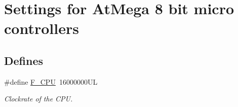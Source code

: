 \hypertarget{group___a_t_m_e_g_a___s_e_t_t_i_n_g_s}{\section{\-Settings for \-At\-Mega 8 bit micro controllers}
\label{group___a_t_m_e_g_a___s_e_t_t_i_n_g_s}
}
\subsection*{\-Defines}
\begin{DoxyCompactItemize}
\item 
\hypertarget{group___a_t_m_e_g_a___s_e_t_t_i_n_g_s_ga43bafb28b29491ec7f871319b5a3b2f8}{\#define \hyperlink{group___a_t_m_e_g_a___s_e_t_t_i_n_g_s_ga43bafb28b29491ec7f871319b5a3b2f8}{\-F\-\_\-\-C\-P\-U}~16000000\-U\-L}\label{group___a_t_m_e_g_a___s_e_t_t_i_n_g_s_ga43bafb28b29491ec7f871319b5a3b2f8}

\begin{DoxyCompactList}\small\item\em \-Clockrate of the \-C\-P\-U. \end{DoxyCompactList}\end{DoxyCompactItemize}
